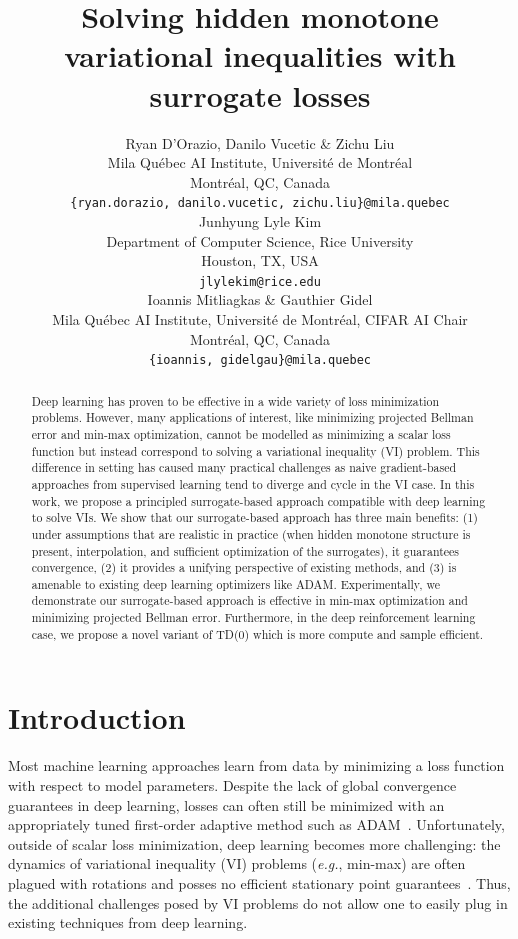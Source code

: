 \documentclass{article} %
\title{Solving hidden monotone variational inequalities with surrogate losses}
\author{Ryan D'Orazio, Danilo Vucetic \& Zichu Liu \\
Mila Qu\'ebec AI Institute, Universit\'e de Montr\'eal\\
Montr\'eal, QC, Canada \\
\texttt{\{ryan.dorazio, danilo.vucetic, zichu.liu\}@mila.quebec} \\
\And
Junhyung Lyle Kim  \\
Department of Computer Science, Rice University \\
Houston, TX, USA \\
\texttt{jlylekim@rice.edu}\\
\AND
Ioannis Mitliagkas \& Gauthier Gidel \\
Mila Qu\'ebec AI Institute, Universit\'e de Montr\'eal, CIFAR AI Chair\\
Montr\'eal, QC, Canada \\
\texttt{\{ioannis, gidelgau\}@mila.quebec}
}
\theoremstyle{definition}
\begin{document}
\maketitle


\begin{abstract}
Deep learning has proven to be effective in a wide variety of loss minimization problems.
However, many applications of interest, like minimizing projected Bellman error and min-max optimization, cannot be modelled as minimizing a scalar loss function but instead correspond to solving a variational inequality (VI) problem.
This difference in setting has caused many practical challenges as naive gradient-based approaches from supervised learning tend to diverge and cycle in the VI case.
In this work, we propose a principled surrogate-based approach compatible with deep learning to solve VIs.
We show that our surrogate-based approach has three main benefits: (1) under assumptions that are realistic in practice (when hidden monotone structure is present, interpolation, and sufficient optimization of the surrogates), it guarantees convergence, (2) it provides a unifying perspective of existing methods, and (3) is amenable to existing deep learning optimizers like ADAM.
Experimentally, we demonstrate our surrogate-based approach is effective in min-max optimization and minimizing projected Bellman error. Furthermore, in the deep reinforcement learning case, we propose a novel variant of TD(0) which is more compute and sample efficient.
\end{abstract}

\section{Introduction}

Most machine learning approaches learn from data by minimizing a loss function with respect to model parameters.
Despite the lack of global convergence guarantees in deep learning, losses can often still be minimized with an appropriately tuned first-order adaptive method such as ADAM~\citep{kingma2014adam}.
Unfortunately, outside of scalar loss minimization, deep learning becomes more challenging: the dynamics of variational inequality (VI) problems (\textit{e.g.}, min-max) are often plagued with rotations and posses no efficient stationary point guarantees~\citep{daskalakis2021complexity}.
Thus, the additional challenges posed by VI problems do not allow one to easily plug in existing techniques from deep learning.
\end{document}
